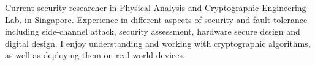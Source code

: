 

\begin{cvparagraph}

Current security researcher in Physical Analysis and Cryptographic Engineering Lab. in Singapore. Experience in different aspects of security and fault-tolerance including side-channel attack, security assessment, hardware secure design and digital design. I enjoy understanding and working with cryptographic algorithms, as well as deploying them on real world devices. 
\end{cvparagraph}
